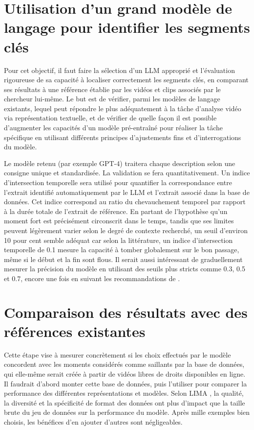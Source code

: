 \documentclass[livre]{udes-genie-these}
\begin{document}
\section{Utilisation d'un grand modèle de langage pour identifier les segments clés}

Pour cet objectif, il faut faire la sélection d'un LLM approprié et l'évaluation rigoureuse de sa capacité à localiser correctement les segments clés, en comparant ses résultats à une référence établie par les vidéos et clips associés par le chercheur lui-même. Le but est de vérifier, parmi les modèles de langage existants, lequel peut répondre le plus adéquatement à la tâche d'analyse vidéo via représentation textuelle, et de vérifier de quelle façon il est possible d'augmenter les capacités d'un modèle pré-entraîné pour réaliser la tâche spécifique en utilisant différents principes d'ajustements fins et d'interrogations du modèle.

Le modèle retenu (par exemple GPT-4) traitera chaque description selon une consigne unique et standardisée. La validation se fera quantitativement. Un indice d'intersection temporelle sera utilisé pour quantifier la correspondance entre l'extrait identifié automatiquement par le LLM et l'extrait associé dans la base de données. Cet indice correspond au ratio du chevauchement temporel par rapport à la durée totale de l'extrait de référence. En partant de l’hypothèse qu’un moment fort est précisément circonscrit dans le temps, tandis que ses limites peuvent légèrement varier selon le degré de contexte recherché, un seuil d’environ 10 pour cent semble adéquat car selon la littérature, un indice d'intersection temporelle de 0.1 mesure la capacité à tomber globalement sur le bon passage, même si le début et la fin sont flous. Il serait aussi intéressant de graduellement mesurer la précision du modèle en utilisant des seuils plus stricts comme 0.3, 0.5 et 0.7, encore une fois en suivant les recommandations de \cite{chae2024_benchmark}.



\section{Comparaison des résultats avec des références existantes}

Cette étape vise à mesurer concrètement si les choix effectués par le modèle concordent avec les moments considérés comme saillants par la base de données, qui elle-même serait créée à partir de vidéos libres de droits disponibles en ligne. Il faudrait d'abord monter cette base de données, puis l'utiliser pour comparer la performance des différentes représentations et modèles. Selon LIMA \cite{zhou2023lima}, la qualité, la diversité et la spécificité de format des données ont plus d’impact que la taille brute du jeu de données sur la performance du modèle. Après mille exemples bien choisis, les bénéfices d’en ajouter d’autres sont négligeables.
\end{document}
